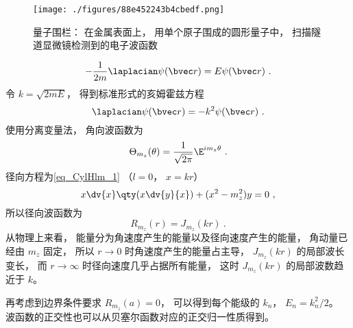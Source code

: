 
\begin{issues}
\issueDraft
\end{issues}


\begin{figure}[ht]
\centering
\texttt{[image: ./figures/88e452243b4cbedf.png]}
\caption{量子围栏： 在金属表面上， 用单个原子围成的圆形量子中， 扫描隧道显微镜检测到的电子波函数} \label{fig_CirISW_1}
\end{figure}

\begin{equation}
-\frac{1}{2m}\laplacian \psi(\bvec r) = E\psi(\bvec r)~.
\end{equation}
令 $k = \sqrt{2mE}$， 得到标准形式的亥姆霍兹方程
\begin{equation}
\laplacian \psi(\bvec r) = -k^2\psi(\bvec r)~.
\end{equation}
使用分离变量法， 角向波函数为
\begin{equation}
\Theta_{m_z}(\theta) = \frac{1}{\sqrt{2\pi}} \E^{im_z \theta}~.
\end{equation}
径向方程为\autoref{eq_CylHlm_1} （$l = 0$， $x = kr$）
\begin{equation}
x \dv{x} \qty(x\dv{y}{x}) + (x^2 - m_z^2)y = 0~,
\end{equation}
所以径向波函数为
\begin{equation}
R_{m_z}(r) = J_{m_z}(kr)~.
\end{equation}
从物理上来看， 能量分为角速度产生的能量以及径向速度产生的能量， 角动量已经由 $m_z$ 固定， 所以 $r \to 0$ 时角速度产生的能量占主导， $J_{m_z}(kr)$ 的局部波长变长， 而 $r\to \infty$ 时径向速度几乎占据所有能量， 这时 $J_{m_z}(kr)$ 的局部波数趋近于 $k$。

再考虑到边界条件要求 $R_{m_z}(a)  = 0$， 可以得到每个能级的 $k_n$， $E_n = k_n^2/2$。 波函数的正交性也可以从贝塞尔函数对应的正交归一性质得到。
